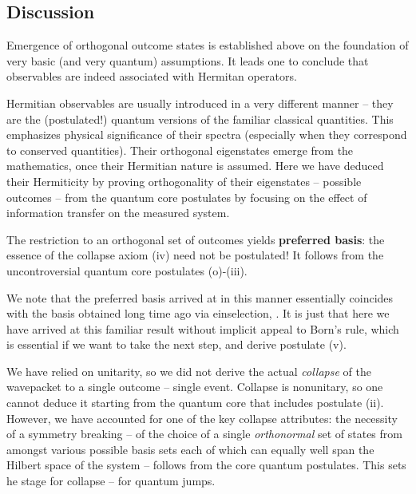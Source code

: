 \documentclass[aps,amsmath,amssymb,amsfonts,12pt]{revtex4-1}
\newcommand{\+}         {\dagger}
\begin{document}
{\subsection{Discussion}

Emergence of orthogonal outcome states is established above on the
foundation of very basic (and very quantum) assumptions. It leads one to conclude that observables are indeed associated with Hermitan operators. 

Hermitian observables are usually introduced in a very different manner -- they are the (postulated!) quantum versions of the familiar classical quantities. This emphasizes physical significance of their spectra (especially when they correspond to conserved quantities). Their orthogonal eigenstates emerge from the mathematics, once their Hermitian nature is assumed. Here we have deduced their Hermiticity by proving orthogonality of their eigenstates -- possible outcomes -- from the quantum core postulates by focusing on the effect of information transfer on the measured system.

The restriction to an orthogonal set of outcomes yields {\bf preferred basis}:
the essence of the collapse axiom (iv) need not be postulated! It follows from the
uncontroversial quantum core postulates (o)-(iii). 

We note that the preferred basis arrived at in this manner essentially coincides with
the basis obtained long time ago via einselection, \cite{69,70}. It is just that here we have arrived at this
familiar result without implicit appeal to Born's rule, which is essential if we want to take the next step,
and derive postulate (v).

We have relied on unitarity, so we did not derive the actual {\it collapse} of the wavepacket to a single outcome -- single event. Collapse 
is nonunitary, so one cannot deduce it starting from the quantum core that includes postulate (ii). However, we have accounted for one of the key collapse attributes:
the necessity of a symmetry breaking -- of the choice of a single {\it orthonormal} set of states from amongst various possible basis sets each of which can equally
well span the Hilbert space of the system -- follows from the core quantum postulates. This sets he stage for collapse -- for quantum jumps.

}
\end{document}
